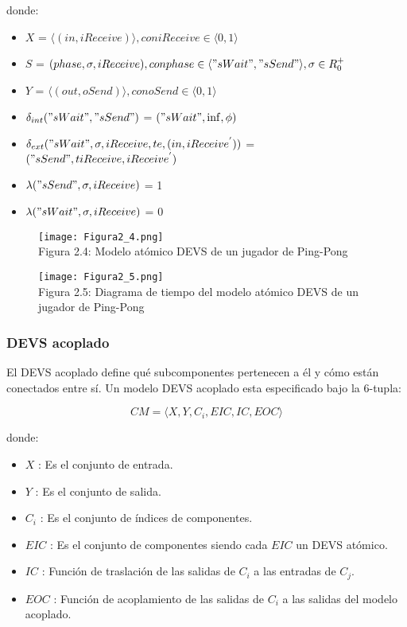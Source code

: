 \noindent donde:

\begin{itemize}
\item $X$ = $\langle(in,{i}Receive)\rangle, con {i}Receive \in\langle{0,1}\rangle$
\item $S$ = $(phase,\sigma,{i}Receive), con phase \in\langle"{s}Wait","{s}Send"\rangle,\sigma \in {R}^{+}_{0}$
\item $Y$ = $\langle(out,{o}Send)\rangle, con {o}Send \in\langle{0,1}\rangle$
\item $\delta_{int}("{s}Wait","{s}Send")$ = $("{s}Wait",\inf,\phi)$
\item $\delta_{ext}("{s}Wait",\sigma,{i}Receive,t{e},(in,{i}Receive^{'}))$ = $("{s}Send",t{iReceive},{i}Receive^{'})$
\item $\lambda("{s}Send",\sigma,{i}Receive)$ = 1
\item $\lambda("{s}Wait",\sigma,{i}Receive)$ = 0
\end{itemize}

\begin{figure}[!ht]
\begin{center}
\texttt{[image: Figura2\_4.png]}\\[0.5cm]
Figura 2.4: Modelo atómico DEVS de un jugador de Ping-Pong
\end{center}
\end{figure}

\begin{figure}[!ht]
\begin{center}
\texttt{[image: Figura2\_5.png]}\\[0.5cm]
Figura 2.5: Diagrama de tiempo del modelo atómico DEVS de un jugador de Ping-Pong
\end{center}
\end{figure}

\subsubsection{DEVS acoplado}
El DEVS acoplado define qué subcomponentes pertenecen a él y cómo están conectados entre sí. Un modelo DEVS acoplado esta especificado bajo la 6-tupla:

\begin{equation}\label{eq:DevsAcoplado}
CM = \langle X,Y,C_{i},EIC,IC,EOC\rangle
\end{equation}

\noindent donde:

\begin{itemize}
\item $X$ : Es el conjunto de entrada.	
\item $Y$ : Es el conjunto de salida. 
\item $C_{i}$ : Es el conjunto de índices de componentes.
\item $EIC$ : Es el conjunto de componentes siendo cada $EIC$ un DEVS atómico.
\item $IC$ : Función de traslación de las salidas de $C_{i}$ a las entradas de $C_{j}$.
\item $EOC$ : Función de acoplamiento de las salidas de $C_{i}$ a las salidas del modelo acoplado.
\end{itemize}

